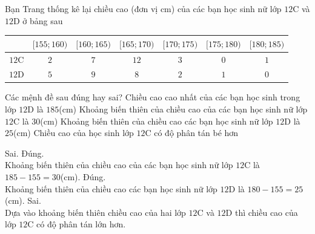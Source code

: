 \begin{ex}%
	Bạn Trang thống kê lại chiều cao (đơn vị cm) của các bạn học sinh nữ lớp $12$C và $12$D ở bảng sau
	\begin{center}
		\begin{tabular}{|c|c|c|c|c|c|c|}
			\hline
			\diagbox[width=8em]{Lớp}{Chiều cao} & $[155;160)$ & $[160;165)$ & $[165;170)$ & $[170;175)$ & $[175;180)$ & $[180;185)$ \\
			\hline
			$12$C & $2$ & $7$ & $12$ & $3$ & $0$ & $1$ \\
			\hline
			$12$D & $5$ & $9$ & $8$ & $2$ & $1$ & $0$ \\
			\hline
		\end{tabular}
	\end{center}
	Các mệnh đề sau đúng hay sai?
	\choiceTF
	{Chiều cao cao nhất của các bạn học sinh trong lớp $12$D là $185$(cm)}
	{\True Khoảng biến thiên của chiều cao của các bạn học sinh nữ lớp $12$C là $30$(cm)}
	{\True Khoảng biến thiên của chiều cao các bạn học sinh nữ lớp $12$D là $25$(cm)}
	{Chiều cao của học sinh lớp $12$C có độ phân tán bé hơn}
	\loigiai
	{
		\begin{itemchoice}
			\itemch Sai.
			\itemch Đúng. \\
			Khoảng biến thiên của chiều cao của các bạn học sinh nữ lớp $12$C là $185-155=30$(cm).
			\itemch Đúng.\\ Khoảng biến thiên của chiều cao các bạn học sinh nữ lớp $12$D là $180-155=25$(cm).
			\itemch Sai. \\ Dựa vào khoảng biến thiên chiều cao của hai lớp $12$C và $12$D thì chiều cao của lớp $12$C có độ phân tán lớn hơn. 
		\end{itemchoice}
	}
\end{ex}

